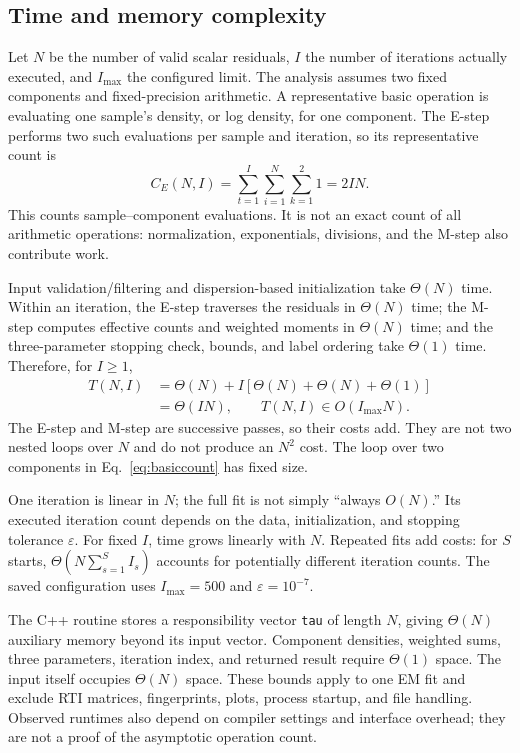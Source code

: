 \documentclass[conference,letterpaper]{IEEEtran}
\begin{document}
\subsection{Time and memory complexity}
Let $N$ be the number of valid scalar residuals, $I$ the number of iterations actually executed, and $I_{\max}$ the configured limit. The analysis assumes two fixed components and fixed-precision arithmetic. A representative basic operation is evaluating one sample's density, or log density, for one component. The E-step performs two such evaluations per sample and iteration, so its representative count is
\begin{equation}
C_E(N,I)=\sum_{t=1}^{I}\sum_{i=1}^{N}\sum_{k=1}^{2}1=2IN.
\label{eq:basiccount}
\end{equation}
This counts sample--component evaluations. It is not an exact count of all arithmetic operations: normalization, exponentials, divisions, and the M-step also contribute work.

Input validation/filtering and dispersion-based initialization take $\Theta(N)$ time. Within an iteration, the E-step traverses the residuals in $\Theta(N)$ time; the M-step computes effective counts and weighted moments in $\Theta(N)$ time; and the three-parameter stopping check, bounds, and label ordering take $\Theta(1)$ time. Therefore, for $I\geq1$,
\begin{align}
T(N,I)&=\Theta(N)+I[\Theta(N)+\Theta(N)+\Theta(1)]\nonumber\\
&=\Theta(IN),\qquad T(N,I)\in O(I_{\max}N).
\end{align}
The E-step and M-step are successive passes, so their costs add. They are not two nested loops over $N$ and do not produce an $N^2$ cost. The loop over two components in Eq.~\eqref{eq:basiccount} has fixed size.

One iteration is linear in $N$; the full fit is not simply ``always $O(N)$.'' Its executed iteration count depends on the data, initialization, and stopping tolerance $\varepsilon$. For fixed $I$, time grows linearly with $N$. Repeated fits add costs: for $S$ starts, $\Theta(N\sum_{s=1}^{S}I_s)$ accounts for potentially different iteration counts. The saved configuration uses $I_{\max}=500$ and $\varepsilon=10^{-7}$.

The C++ routine stores a responsibility vector \texttt{tau} of length $N$, giving $\Theta(N)$ auxiliary memory beyond its input vector. Component densities, weighted sums, three parameters, iteration index, and returned result require $\Theta(1)$ space. The input itself occupies $\Theta(N)$ space. These bounds apply to one EM fit and exclude RTI matrices, fingerprints, plots, process startup, and file handling. Observed runtimes also depend on compiler settings and interface overhead; they are not a proof of the asymptotic operation count.
\end{document}

